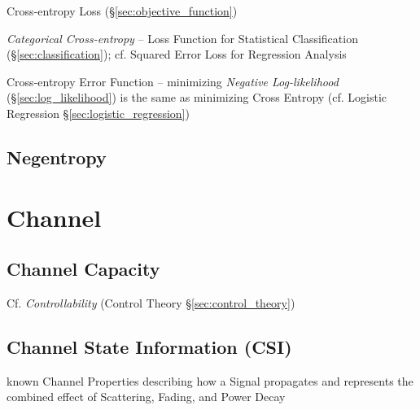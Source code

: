 Cross-entropy Loss (\S\ref{sec:objective_function})

\emph{Categorical Cross-entropy} -- Loss Function for Statistical Classification
(\S\ref{sec:classification}); cf. Squared Error Loss for Regression Analysis

\fist Cross-entropy Error Function -- minimizing \emph{Negative Log-likelihood}
(\S\ref{sec:log_likelihood}) is the same as minimizing Cross Entropy (cf.
Logistic Regression \S\ref{sec:logistic_regression})



\subsection{Negentropy}\label{sec:negentropy}



\section{Channel}\label{sec:channel}

\subsection{Channel Capacity}\label{sec:channel_capacity}

\fist Cf. \emph{Controllability} (Control Theory
\S\ref{sec:control_theory})



\subsection{Channel State Information (CSI)}\label{sec:csi}

known Channel Properties describing how a Signal propagates and represents the
combined effect of Scattering, Fading, and Power Decay

